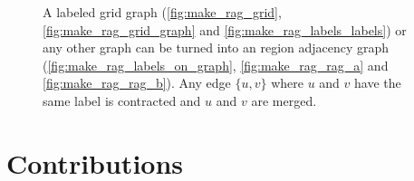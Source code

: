 \begin{figure}
{}
\caption[Make a region adjacency graph from a labeled graph]{
    A labeled grid graph  (\cref{fig:make_rag_grid}, \cref{fig:make_rag_grid_graph}  and \ref{fig:make_rag_labels_labels})
    or any other graph can be turned into an region adjacency graph (\cref{fig:make_rag_labels_on_graph}, \cref{fig:make_rag_rag_a} and \cref{fig:make_rag_rag_b}). 
    Any edge  $\{u,v\}$ where $u$ and $v$ have the same label is contracted and $u$ and $v$ 
    are merged.
}\label{fig:make_rag}
\end{figure}


\section{Contributions}

